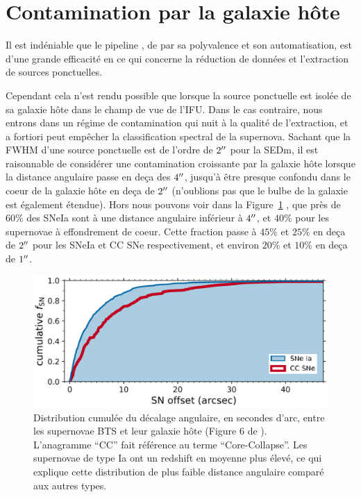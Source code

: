 \documentclass[../main/main.tex]{subfiles}
\begin{document}
\section{Contamination par la galaxie hôte}

Il est indéniable que le pipeline \pysedm, de par sa polyvalence et son
automatisation, est d'une grande efficacité en ce qui concerne la
réduction de données et l'extraction de sources ponctuelles.

Cependant cela n'est rendu possible que lorsque la source ponctuelle est
isolée de sa galaxie hôte dans le champ de vue de l'IFU. Dans le cas
contraire, nous entrons dans un régime de contamination qui nuit à la
qualité de l'extraction, et a fortiori peut empêcher la classification
spectral de la supernova. Sachant que la FWHM d'une source ponctuelle
est de l'ordre de $2^{\prime\prime}$ pour la SEDm, il est raisonnable de
considérer une contamination croissante par la galaxie hôte lorsque la
distance angulaire passe en deça des $4^{\prime\prime}$, jusqu'à être presque
confondu dans le coeur de la galaxie hôte en deça de $2^{\prime\prime}$
(n'oublions pas que le bulbe de la galaxie
est également étendue). Hors nous pouvons voir dans la
Figure~\ref{fig:cumulsnhostdist} \citep{FremlingZTFspec2020}, que près
de $60\%$ des SNeIa sont à une distance angulaire inférieur à
$4^{\prime\prime}$, et $40\%$ pour les supernovae à effondrement de coeur. Cette
fraction passe à $45\%$ et $25\%$ en deça de $2^{\prime\prime}$ pour les SNeIa
et CC SNe respectivement, et environ $20\%$
et $10\%$ en deça de $1^{\prime\prime}$.


\begin{figure}
  \begin{minipage}[c]{0.55\textwidth}
    \includegraphics[width=\textwidth]{../figures/03_sedm/cumulsnhostdist.png}
  \end{minipage}\hfill
  \begin{minipage}[c]{0.42\textwidth}
    \caption[Distribution cumulée du décalage angulaire entre les supernovae BTS et leur galaxie hôte]{Distribution cumulée du décalage angulaire, en
    secondes d'arc, entre les supernovae BTS et leur galaxie hôte
    (Figure 6 de \citet{FremlingZTFspec2020}). L'anagramme ``CC'' fait référence au
    terme ``Core-Collapse''. Les supernovae de type Ia ont
  un redshift en moyenne plus élevé, ce qui explique cette
  distribution de plus faible distance angulaire comparé aux autres types.}\label{fig:cumulsnhostdist}
  \end{minipage}
\end{figure}
\end{document}
